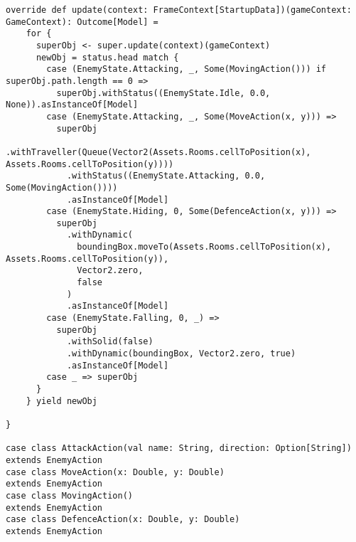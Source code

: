 \begin{lstlisting}[basicstyle=\tiny]
  override def update(context: FrameContext[StartupData])(gameContext: GameContext): Outcome[Model] =
    for {
      superObj <- super.update(context)(gameContext)
      newObj = status.head match {
        case (EnemyState.Attacking, _, Some(MovingAction())) if superObj.path.length == 0 =>
          superObj.withStatus((EnemyState.Idle, 0.0, None)).asInstanceOf[Model]
        case (EnemyState.Attacking, _, Some(MoveAction(x, y))) =>
          superObj
            .withTraveller(Queue(Vector2(Assets.Rooms.cellToPosition(x), Assets.Rooms.cellToPosition(y))))
            .withStatus((EnemyState.Attacking, 0.0, Some(MovingAction())))
            .asInstanceOf[Model]
        case (EnemyState.Hiding, 0, Some(DefenceAction(x, y))) =>
          superObj
            .withDynamic(
              boundingBox.moveTo(Assets.Rooms.cellToPosition(x), Assets.Rooms.cellToPosition(y)),
              Vector2.zero,
              false
            )
            .asInstanceOf[Model]
        case (EnemyState.Falling, 0, _) =>
          superObj
            .withSolid(false)
            .withDynamic(boundingBox, Vector2.zero, true)
            .asInstanceOf[Model]
        case _ => superObj
      }
    } yield newObj

}

case class AttackAction(val name: String, direction: Option[String]) extends EnemyAction
case class MoveAction(x: Double, y: Double)                          extends EnemyAction
case class MovingAction()                                            extends EnemyAction
case class DefenceAction(x: Double, y: Double)                       extends EnemyAction

\end{lstlisting}